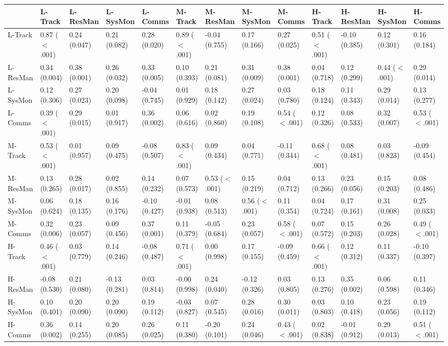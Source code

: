 \begin{tabular}{lllllllllllll}
\toprule
 & L-Track & L-ResMan & L-SysMon & L-Comms & M-Track & M-ResMan & M-SysMon & M-Comms & H-Track & H-ResMan & H-SysMon & H-Comms \\
\midrule
L-Track & 0.87 ($<$.001) & 0.24 (0.047) & 0.21 (0.082) & 0.28 (0.020) & 0.89 ($<$.001) & -0.04 (0.755) & 0.17 (0.166) & 0.27 (0.025) & 0.51 ($<$.001) & -0.10 (0.385) & 0.12 (0.301) & 0.16 (0.184) \\
L-ResMan & 0.34 (0.004) & 0.38 (0.001) & 0.26 (0.032) & 0.33 (0.005) & 0.10 (0.393) & 0.21 (0.081) & 0.31 (0.009) & 0.38 (0.001) & 0.04 (0.718) & 0.12 (0.299) & 0.44 ($<$.001) & 0.29 (0.014) \\
L-SysMon & 0.12 (0.306) & 0.27 (0.023) & 0.20 (0.098) & -0.04 (0.745) & 0.01 (0.929) & 0.18 (0.142) & 0.27 (0.024) & 0.03 (0.780) & 0.18 (0.124) & 0.11 (0.343) & 0.29 (0.014) & 0.13 (0.277) \\
L-Comms & 0.39 ($<$.001) & 0.29 (0.015) & 0.01 (0.917) & 0.36 (0.002) & 0.06 (0.616) & 0.02 (0.860) & 0.19 (0.108) & 0.54 ($<$.001) & 0.12 (0.326) & 0.08 (0.533) & 0.32 (0.007) & 0.53 ($<$.001) \\
M-Track & 0.53 ($<$.001) & 0.01 (0.957) & 0.09 (0.475) & -0.08 (0.507) & 0.83 ($<$.001) & 0.09 (0.434) & 0.04 (0.771) & -0.11 (0.344) & 0.68 ($<$.001) & 0.08 (0.481) & 0.03 (0.823) & -0.09 (0.454) \\
M-ResMan & 0.13 (0.265) & 0.28 (0.017) & 0.02 (0.855) & 0.14 (0.232) & 0.07 (0.573) & 0.53 ($<$.001) & 0.15 (0.219) & 0.04 (0.712) & 0.13 (0.266) & 0.23 (0.056) & 0.15 (0.203) & 0.08 (0.486) \\
M-SysMon & 0.06 (0.624) & 0.18 (0.135) & 0.16 (0.176) & -0.10 (0.427) & -0.01 (0.938) & 0.08 (0.513) & 0.56 ($<$.001) & 0.11 (0.354) & 0.04 (0.724) & 0.17 (0.161) & 0.31 (0.008) & 0.25 (0.033) \\
M-Comms & 0.32 (0.006) & 0.23 (0.057) & 0.09 (0.456) & 0.37 (0.001) & 0.11 (0.379) & -0.05 (0.684) & 0.23 (0.057) & 0.58 ($<$.001) & 0.07 (0.572) & 0.15 (0.203) & 0.26 (0.028) & 0.49 ($<$.001) \\
H-Track & 0.46 ($<$.001) & 0.03 (0.779) & 0.14 (0.246) & -0.08 (0.487) & 0.71 ($<$.001) & 0.00 (0.998) & 0.17 (0.155) & -0.09 (0.459) & 0.66 ($<$.001) & 0.12 (0.312) & 0.11 (0.337) & -0.10 (0.397) \\
H-ResMan & -0.08 (0.530) & 0.21 (0.080) & -0.13 (0.281) & 0.03 (0.814) & -0.00 (0.998) & 0.24 (0.040) & -0.12 (0.326) & 0.03 (0.805) & 0.13 (0.276) & 0.35 (0.002) & 0.06 (0.598) & 0.11 (0.346) \\
H-SysMon & 0.10 (0.401) & 0.20 (0.090) & 0.20 (0.090) & 0.19 (0.112) & -0.03 (0.827) & 0.07 (0.545) & 0.28 (0.016) & 0.30 (0.011) & 0.03 (0.803) & 0.10 (0.418) & 0.23 (0.056) & 0.19 (0.112) \\
H-Comms & 0.36 (0.002) & 0.14 (0.255) & 0.20 (0.085) & 0.26 (0.025) & 0.11 (0.380) & -0.20 (0.101) & 0.24 (0.046) & 0.43 ($<$.001) & 0.02 (0.838) & -0.01 (0.912) & 0.29 (0.013) & 0.51 ($<$.001) \\
\bottomrule
\end{tabular}
